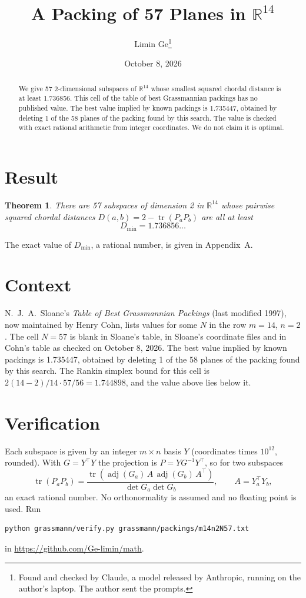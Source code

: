 \documentclass[11pt,a4paper]{article}
\title{A Packing of 57 Planes in $\mathbb{R}^{14}$}
\author{Limin Ge\thanks{Found and checked by Claude, a model released by Anthropic, running on the author's laptop. The author sent the prompts.}}
\date{October 8, 2026}
\newtheorem*{theorem}{Theorem}
\begin{document}
\maketitle
\begin{abstract}
We give 57 2-dimensional subspaces of $\mathbb{R}^{14}$ whose smallest squared chordal distance is at least 1.736856. This cell of the table of best Grassmannian packings has no published value. The best value implied by known packings is 1.735447, obtained by deleting 1 of the 58 planes of the packing found by this search. The value is checked with exact rational arithmetic from integer coordinates. We do not claim it is optimal.
\end{abstract}

\section{Result}
\begin{theorem}
There are 57 subspaces of dimension 2 in $\mathbb{R}^{14}$ whose pairwise squared chordal distances $D(a,b) = 2 - \operatorname{tr}(P_aP_b)$ are all at least
\[ D_{\min} = 1.736856\ldots \]
\end{theorem}
The exact value of $D_{\min}$, a rational number, is given in Appendix~A.


\section{Context}
N.~J.~A.~Sloane's \emph{Table of Best Grassmannian Packings} (last modified 1997), now maintained by Henry Cohn, lists values for some $N$ in the row $m=14$, $n=2$. The cell $N=57$ is blank in Sloane's table, in Sloane's coordinate files and in Cohn's table as checked on October 8, 2026. The best value implied by known packings is 1.735447, obtained by deleting 1 of the 58 planes of the packing found by this search. The Rankin simplex bound for this cell is $2(14-2)/14\cdot 57/56 = 1.744898$, and the value above lies below it.


\section{Verification}
Each subspace is given by an integer $m\times n$ basis $Y$ (coordinates times $10^{12}$, rounded). With $G=Y^\top Y$ the projection is $P=YG^{-1}Y^\top$, so for two subspaces
\[ \operatorname{tr}(P_aP_b)=\frac{\operatorname{tr}(\operatorname{adj}(G_a)\,A\,\operatorname{adj}(G_b)\,A^\top)}{\det G_a\det G_b},\qquad A=Y_a^\top Y_b, \]
an exact rational number. No orthonormality is assumed and no floating point is used. Run
\begin{verbatim}
python grassmann/verify.py grassmann/packings/m14n2N57.txt
\end{verbatim}
in \url{https://github.com/Ge-limin/math}.
\end{document}
